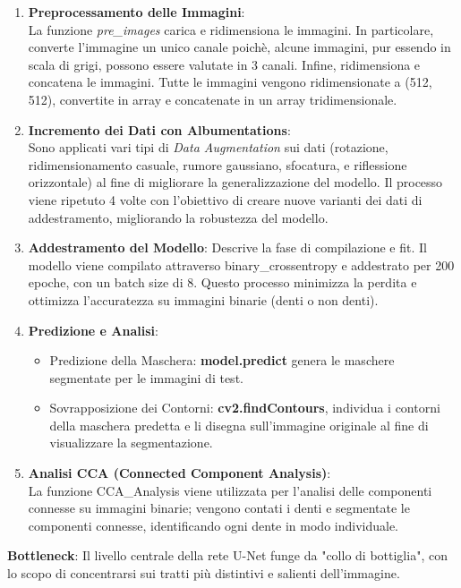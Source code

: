 \documentclass[12pt,a4paper,openright,twoside]{book}
\begin{document}
\begin{enumerate}
\item \textbf{Preprocessamento delle Immagini}:\\
La funzione {\itshape pre\_images} carica e ridimensiona le immagini. In particolare, converte l'immagine un unico canale poichè, alcune immagini, pur essendo in scala di grigi, possono essere valutate in 3 canali. Infine, ridimensiona e concatena le immagini. Tutte le immagini vengono ridimensionate a (512, 512), convertite in array e concatenate in un array tridimensionale.
\item \textbf{Incremento dei Dati con Albumentations}:\\
Sono applicati vari tipi di {\itshape Data Augmentation} sui dati (rotazione, ridimensionamento casuale, rumore gaussiano, sfocatura, e riflessione orizzontale) al fine di migliorare la generalizzazione del modello. Il processo viene ripetuto 4 volte con l'obiettivo di creare nuove varianti dei dati di addestramento, migliorando la robustezza del modello.
\item \textbf{Addestramento del Modello}:
Descrive la fase di compilazione e fit. Il modello viene compilato attraverso binary\_crossentropy e addestrato per 200 epoche, con un batch size di 8. Questo processo minimizza la perdita e ottimizza l'accuratezza su immagini binarie (denti o non denti).
\item \textbf{Predizione e Analisi}:
\begin{itemize}
\item Predizione della Maschera: \textbf{model.predict} genera le maschere segmentate per le immagini di test.
\item Sovrapposizione dei Contorni: \textbf{cv2.findContours}, individua i contorni della maschera predetta e li disegna sull'immagine originale al fine di visualizzare la segmentazione.
\end{itemize}
\item \textbf{Analisi CCA (Connected Component Analysis)}:\\
La funzione CCA\_Analysis viene utilizzata per l'analisi delle componenti connesse su immagini binarie; vengono contati i denti e segmentate le componenti connesse, identificando ogni dente in modo individuale.
\end{enumerate}

\textbf{Bottleneck}: Il livello centrale della rete U-Net funge da "collo di bottiglia", con lo scopo di concentrarsi sui tratti più distintivi e salienti dell’immagine.

\end{document}
